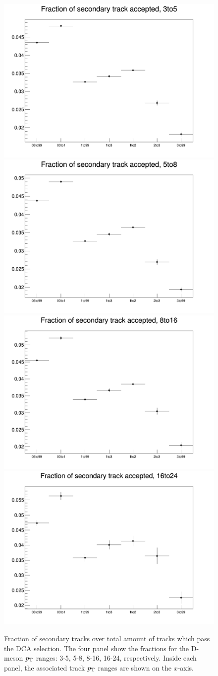 \begin{figure}[h]   %
	\centering
	\includegraphics[width=.48\linewidth]{figures/SecTracks/FractOfSecOverTotal_3to5.png}
	\includegraphics[width=.48\linewidth]{figures/SecTracks/FractOfSecOverTotal_5to8.png}
    \includegraphics[width=.48\linewidth]{figures/SecTracks/FractOfSecOverTotal_8to16.png}
    \includegraphics[width=.48\linewidth]{figures/SecTracks/FractOfSecOverTotal_16to24.png}
	\caption{Fraction of secondary tracks over total amount of tracks which pass the DCA selection. The four panel show the fractions for the D-meson $p_{\rm T}$ ranges: 3-5, 5-8, 8-16, 16-24, respectively. Inside each panel, the associated track $p_{\rm T}$ ranges are shown on the $x$-axis.}
	\label{fig:secnumber}	
\end{figure}

